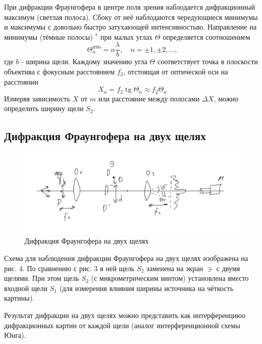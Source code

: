 \documentclass[a4paper, 12pt]{article}
\begin{document}
При дифракции Фраунгофера в центре поля зрения наблодается дифракционный максимум (светлая полоса). Сбоку от неё наблодаются чередующиеся минимумы и максимумы с довольно быстро затухаюощей интенсивностыю. Направление на минимумы (тёмные полосы) ${ }^*$ при малых углах $\Theta$ определяется соотношением
$$
\Theta_n^{\min }=n \frac{\lambda}{b}, \quad n= \pm 1, \pm 2, \ldots,
$$
где $b$ - ширина щели. Каждому значению угла $\Theta$ соответствует точка в плоскости объектива с фокусным расстоянием $f_2$, отстоящая от оптической оси на расстоянии
$$
X_n=f_2 \operatorname{tg} \Theta_n \approx f_2 \Theta_n
$$
Измеряя зависимость $X$ от $m$ или расстояние между полосами $\Delta X$, можно определить ширину щели $S_2$.


\subsection*{Дифракция Фраунгофера на двух щелях}

\begin{figure}[H]
    \centering
    \includegraphics[width=1\textwidth]{fraun2.jpg}
    \caption{Дифракция Фраунгофера на двух щелях}
    \label{fig:ris3}
\end{figure}

Схема для наблюдения дифракции Фраунгофера на двух щелях изображена на рис. 4. По сравнению с рис. 3 в ней щель $S_2$ заменена на экран $\ni$ с двумя щелями. При этом щель $S_2$ (с микрометрическим винтом) установлена вместо входной щели $S_1$ (для измерения влияния ширины источника на чёткость картины).

Результат дифракции на двух щелях можно представить как интерференциюо дифракционных картин от каждой щели (аналог интерференционной схемы Юнга).
\end{document}
